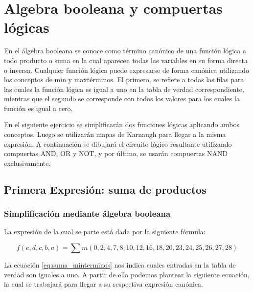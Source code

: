 %
%
%


\section{Algebra booleana y compuertas lógicas}

En el álgebra booleana se conoce como término canónico de una función lógica a todo producto o suma en la cual aparecen todas las variables en su forma directa o inversa. Cualquier función lógica puede expresarse de forma canónica utilizando los conceptos de min y maxtérminos. El primero, se refiere a todas las filas para las cuales la función lógica es igual a uno en la tabla de verdad correspondiente, mientras que el segundo se corresponde con todos los valores para los cuales la función es igual a cero. 

En el siguiente ejercicio se simplificarán dos funciones lógicas aplicando ambos conceptos. Luego se utilizarán mapas de Karnaugh para llegar a la misma expresión. A continuación se dibujará el circuito lógico resultante utilizando compuertas AND, OR y NOT, y por último, se usarán compuertas NAND exclusivamente.

\subsection{Primera Expresión: suma de productos}

\subsubsection{Simplificación mediante álgebra booleana}

La expresión de la cual se parte está dada por la siguiente fórmula:

\begin{equation}\label{eq:suma_minterminos}
f(e,d,c,b,a) = \sum{m(0, 2, 4, 7, 8, 10, 12, 16, 18, 20, 23, 24, 25, 26, 27, 28)}
\end{equation}

La ecuación \ref{eq:suma_minterminos} nos indica cuales entradas en la tabla de verdad son iguales a uno. A partir de ella podemos plantear la siguiente ecuación, la cual se trabajará para llegar a su respectiva expresión canónica.

